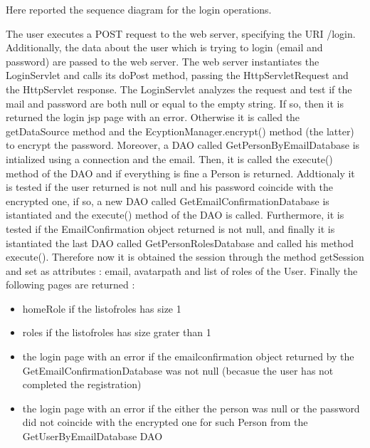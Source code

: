 \begin{flushleft}
Here reported the sequence diagram for the login operations. 

The user executes a POST request to the web server, specifying the URI /login. Additionally, the data about the user which is trying to login (email and password) are passed to the web server. The web server instantiates the LoginServlet and calls its doPost method, passing the HttpServletRequest and the HttpServlet response. The LoginServlet analyzes the request and test if the mail and password are both  null or equal to the empty string. If so, then it is returned the login jsp page with an error. Otherwise it is called the getDataSource method and the EcyptionManager.encrypt() method (the latter) to encrypt the password. Moreover, a DAO called GetPersonByEmailDatabase is intialized using a connection and the email. Then, it is called the execute() method of the DAO and if everything is fine a Person is returned. Addtionaly it is tested if the user returned is not null and his password coincide with the encrypted one, if so, a new DAO called GetEmailConfirmationDatabase is istantiated and the execute() method of the DAO is called. Furthermore, it is tested if the EmailConfirmation object returned is not null, and finally it is istantiated the last DAO called GetPersonRolesDatabase and called his method execute().
Therefore now it is obtained the session through the method getSession and set as attributes : email, avatarpath and list of roles of the User.
Finally the following pages are returned :
\begin{itemize}
	\item homeRole if the listofroles has size 1
	\item roles if the listofroles has size grater than 1
	\item the login page with an error if the emailconfirmation object returned by the GetEmailConfirmationDatabase was not null (becasue the user has not completed the registration) 
	\item the login page with an error if the either the person was null or the password did not coincide with the encrypted one for such Person from the GetUserByEmailDatabase DAO
\end{itemize}

\end{flushleft}



